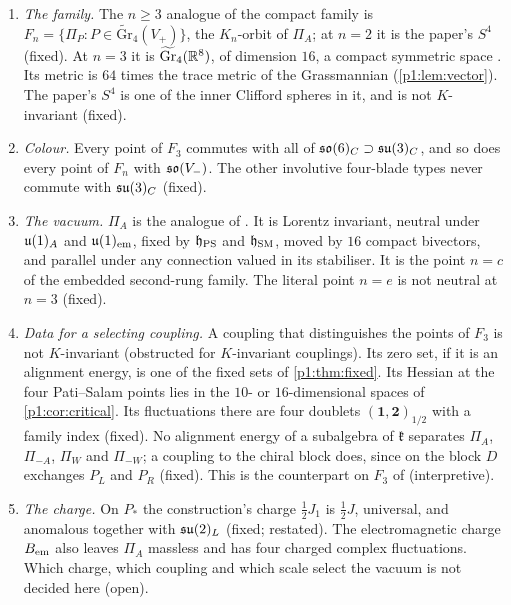 \begin{enumerate}[label=(\alph*),leftmargin=2.2em]
\item \emph{The family.} The $n\ge3$ analogue of the compact family is $F_n=\{\Pi_P:P\in\widetilde{\mathrm{Gr}}_4(V_+)\}$, the $K_n$-orbit of $\Pi_A$; at $n=2$ it is the paper's $S^4$
(fixed). At $n=3$ it is $\widetilde{\mathrm{Gr}}_4(\mathbb{R}^8)$, of dimension $16$, a compact symmetric space \cite{Helgason}. Its metric is $64$ times the trace metric of the
Grassmannian (\cref{p1:lem:vector}). The paper's $S^4$ is one of the inner Clifford spheres in it, and is not $K$-invariant (fixed).
\item \emph{Colour.} Every point of $F_3$ commutes with all of $\mathfrak{so}(6)_C\supset\mathfrak{su}(3)_C$, and so does every point of $F_n$ with $\mathfrak{so}(V_-)$. The other involutive four-blade types never
commute with $\mathfrak{su}(3)_C$ (fixed).
\item \emph{The vacuum.} $\Pi_A$ is the analogue of \cite[Def.~26.5]{ES17}. It is Lorentz invariant, neutral under $\mathfrak{u}(1)_A$ and $\mathfrak{u}(1)_{\rm em}$, fixed by $\mathfrak h_{\rm PS}$ and
$\mathfrak h_{\rm SM}$, moved by $16$ compact bivectors, and parallel under any connection valued in its stabiliser. It is the point $n=c$ of the embedded second-rung
family. The literal point $n=e$ is not neutral at $n=3$ (fixed).
\item \emph{Data for a selecting coupling.} A coupling that distinguishes the points of $F_3$ is not $K$-invariant (obstructed for $K$-invariant couplings). Its zero set, if it is
an alignment energy, is one of the fixed sets of \cref{p1:thm:fixed}. Its Hessian at the four Pati--Salam points lies in the $10$- or $16$-dimensional spaces of
\cref{p1:cor:critical}. Its fluctuations there are four doublets $(\mathbf1,\mathbf2)_{1/2}$ with a family index (fixed). No alignment energy of a subalgebra of $\mathfrak k$
separates $\Pi_A$, $\Pi_{-A}$, $\Pi_W$ and $\Pi_{-W}$; a coupling to the chiral block does, since on the block $D$ exchanges $P_L$ and $P_R$ (fixed). This is the
counterpart on $F_3$ of \cite[Prop.~21.6]{ES17} (interpretive).
\item \emph{The charge.} On $P_*$ the construction's charge $\tfrac12J_1$ is $\tfrac12J$, universal, and anomalous together with $\mathfrak{su}(2)_L$ (fixed; restated). The electromagnetic
charge $B_{\rm em}$ also leaves $\Pi_A$ massless and has four charged complex fluctuations. Which charge, which coupling and which scale select the vacuum is not decided
here (open).
\end{enumerate}

